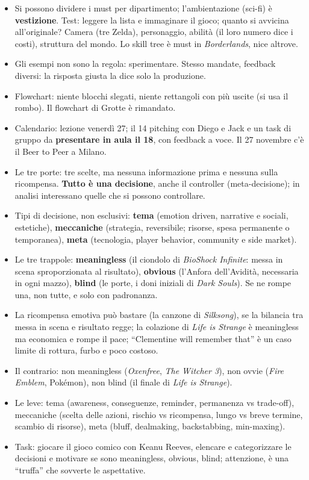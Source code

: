 \begin{itemize}
        sconosciuti è voluta: guardare dieci secondi e annotare le
        meccaniche; dividere la qualità dell'attenzione.
  \item Si possono dividere i must per dipartimento; l'ambientazione
        (sci-fi) è \textbf{vestizione}. Test: leggere la lista e immaginare
        il gioco; quanto si avvicina all'originale? Camera (tre Zelda),
        personaggio, abilità (il loro numero dice i costi), struttura del
        mondo. Lo skill tree è must in \emph{Borderlands}, nice altrove.
  \item Gli esempi non sono la regola: sperimentare. Stesso mandate,
        feedback diversi: la risposta giusta la dice solo la produzione.
  \item Flowchart: niente blocchi slegati, niente rettangoli con più uscite
        (si usa il rombo). Il flowchart di Grotte è rimandato.
  \item Calendario: lezione venerdì 27; il 14 pitching con Diego e Jack e un
        task di gruppo da \textbf{presentare in aula il 18}, con feedback a
        voce. Il 27 novembre c'è il Beer to Peer a Milano.
  \item Le tre porte: tre scelte, ma nessuna informazione prima e nessuna
        sulla ricompensa. \textbf{Tutto è una decisione}, anche il
        controller (meta-decisione); in analisi interessano quelle che si
        possono controllare.
  \item Tipi di decisione, non esclusivi: \textbf{tema} (emotion driven,
        narrative e sociali, estetiche), \textbf{meccaniche} (strategia,
        reversibile; risorse, spesa permanente o temporanea),
        \textbf{meta} (tecnologia, player behavior, community e side
        market).
  \item Le tre trappole: \textbf{meaningless} (il ciondolo di \emph{BioShock
        Infinite}: messa in scena sproporzionata al risultato),
        \textbf{obvious} (l'Anfora dell'Avidità, necessaria in ogni mazzo),
        \textbf{blind} (le porte, i doni iniziali di \emph{Dark Souls}). Se ne
        rompe una, non tutte, e solo con padronanza.
  \item La ricompensa emotiva può bastare (la canzone di \emph{Silksong}), se
        la bilancia tra messa in scena e risultato regge; la colazione di
        \emph{Life is Strange} è meaningless ma economica e rompe il pace;
        ``Clementine will remember that'' è un caso limite di rottura,
        furbo e poco costoso.
  \item Il contrario: non meaningless (\emph{Oxenfree}, \emph{The Witcher
        3}), non ovvie (\emph{Fire Emblem}, Pokémon), non blind (il finale di
        \emph{Life is Strange}).
  \item Le leve: tema (awareness, conseguenze, reminder, permanenza vs
        trade-off), meccaniche (scelta delle azioni, rischio vs ricompensa,
        lungo vs breve termine, scambio di risorse), meta (bluff,
        dealmaking, backstabbing, min-maxing).
  \item Task: giocare il gioco comico con Keanu Reeves, elencare e
        categorizzare le decisioni e motivare se sono meaningless, obvious,
        blind; attenzione, è una ``truffa'' che sovverte le aspettative.
\end{itemize}

